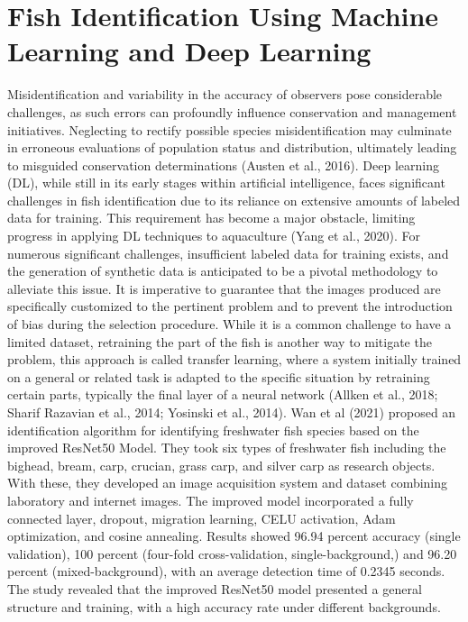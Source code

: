 \section{Fish Identification Using Machine Learning and Deep Learning}
Misidentification and variability in the accuracy of observers pose considerable challenges, as such errors can profoundly influence conservation and management initiatives. Neglecting to rectify possible species misidentification may culminate in erroneous evaluations of population status and distribution, ultimately leading to misguided conservation determinations (Austen et al., 2016).  Deep learning (DL), while still in its early stages within artificial intelligence, faces significant challenges in fish identification due to its reliance on extensive amounts of labeled data for training. This requirement has become a major obstacle, limiting progress in applying DL techniques to aquaculture (Yang et al., 2020). 
For numerous significant challenges, insufficient labeled data for training exists, and the generation of synthetic data is anticipated to be a pivotal methodology to alleviate this issue. It is imperative to guarantee that the images produced are specifically customized to the pertinent problem and to prevent the introduction of bias during the selection procedure. While it is a common challenge to have a limited dataset, retraining the part of the fish is another way to mitigate the problem, this approach is called transfer learning, where a system initially trained on a general or related task is adapted to the specific situation by retraining certain parts, typically the final layer of a neural network (Allken et al., 2018; Sharif Razavian et al., 2014; Yosinski et al., 2014). 
Wan et al (2021) proposed an identification algorithm for identifying freshwater fish species based on the improved ResNet50 Model. They took six types of freshwater fish including the bighead, bream, carp, crucian, grass carp, and silver carp as research objects. With these, they developed an image acquisition system and dataset combining laboratory and internet images. The improved model incorporated a fully connected layer, dropout, migration learning, CELU activation, Adam optimization, and cosine annealing. Results showed 96.94 percent accuracy (single validation), 100 percent (four-fold cross-validation, single-background,) and 96.20 percent (mixed-background), with an average detection time of 0.2345 seconds. The study revealed that the improved ResNet50 model presented a general structure and training, with a high accuracy rate under different backgrounds.
